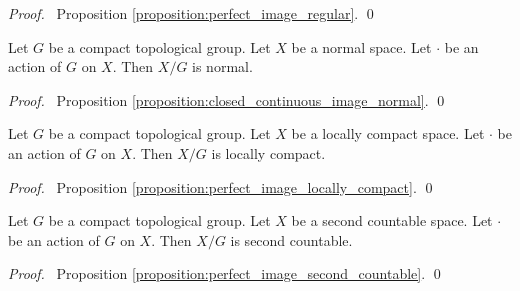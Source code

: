 \begin{proof}
    \pf\ Proposition \ref{proposition:perfect_image_regular}. \qed
\end{proof}

\begin{corollary}
    Let $G$ be a compact topological group. Let $X$ be a normal space.
    Let $\cdot$ be an action of $G$ on $X$. Then $X / G$ is normal.
\end{corollary}

\begin{proof}
    \pf\ Proposition \ref{proposition:closed_continuous_image_normal}. \qed
\end{proof}

\begin{corollary}
    Let $G$ be a compact topological group. Let $X$ be a locally compact space.
    Let $\cdot$ be an action of $G$ on $X$. Then $X / G$ is locally compact.
\end{corollary}

\begin{proof}
    \pf\ Proposition \ref{proposition:perfect_image_locally_compact}. \qed
\end{proof}

\begin{corollary}
    Let $G$ be a compact topological group. Let $X$ be a second countable space.
    Let $\cdot$ be an action of $G$ on $X$. Then $X / G$ is second countable.
\end{corollary}

\begin{proof}
    \pf\ Proposition \ref{proposition:perfect_image_second_countable}. \qed
\end{proof}

